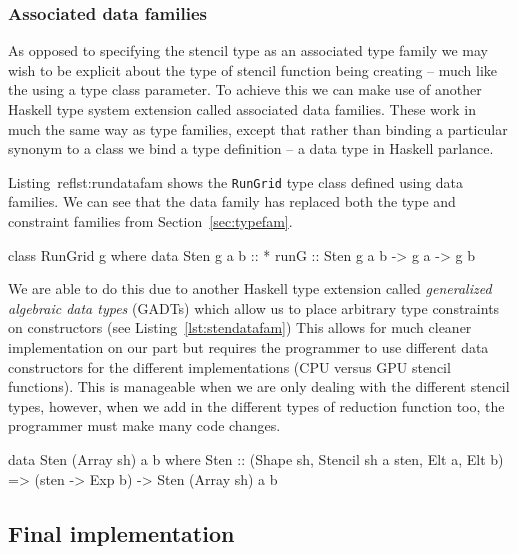 \documentclass[12pt,a4paper,oneside]{scrbook}
\begin{document}
\subsubsection{Associated data families}

As opposed to specifying the stencil type as an associated type family we may
wish to be explicit about the type of stencil function being creating -- much
like the using a type class parameter. To achieve this we can make use of
another Haskell type system extension called associated data families. These
work in much the same way as type families, except that rather than binding a
particular synonym to a class we bind a type definition -- a data type in
Haskell parlance.

Listing~ref{lst:rundatafam} shows the \texttt{RunGrid} type class defined using
data families. We can see that the data family has replaced both the type and
constraint families from Section~\ref{sec:typefam}.

\begin{hflisting}[label=lst:rundatafam,
caption=RunGrid with associated data family.]
class RunGrid g where
    data Sten g a b :: *
    runG :: Sten g a b -> g a -> g b
\end{hflisting}

We are able to do this due to another Haskell type extension called
\emph{generalized algebraic data types} (GADTs) which allow us to place
arbitrary type constraints on constructors (see Listing~\ref{lst:stendatafam})
This allows for much cleaner implementation on our part but requires the
programmer to use different data constructors for the different implementations
(CPU versus GPU stencil functions). This is manageable when we are only dealing
with the different stencil types, however, when we add in the different types of
reduction function too, the programmer must make many code changes.

\begin{hflisting}[label=lst:stendatafam,
caption=An example of a stencil data type for the GPU]
data Sten (Array sh) a b where
        Sten :: (Shape sh, Stencil sh a sten,
                 Elt a, Elt b) =>
                (sten -> Exp b)
                -> Sten (Array sh) a b
\end{hflisting}

\subsection{Final implementation}
\label{sec:final}
\end{document}
